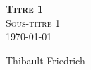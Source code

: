 \documentclass[11pt,a4paper]{report}
\newcommand{\simplesubject}{Titre 1}
\newcommand{\simpletitle}{Sous-titre 1}
\newcommand{\reporttitle}{\textbf{\simplesubject} \bigskip \\\simpletitle}
\newcommand{\reportdate}{\today}
\newcommand{\reportauthor}{Thibault Friedrich}
\begin{document}
   

\begin{titlepage}
    \begin{center}


        \textsc{\Huge \color{bluesection} \reporttitle}\\[0.5cm]
       {\large \reportdate}\bigskip
        

       {\Large \color{bluesubsection} \reportauthor}



    \end{center}
\end{titlepage}

\renewcommand{\contentsname}{\color{bluesection} Table of contents}
\tableofcontents

\clearpage


\end{document}
